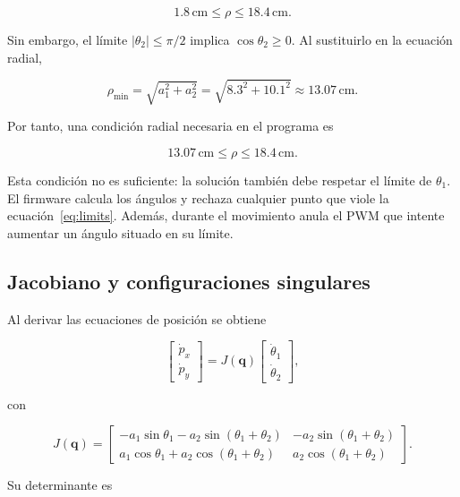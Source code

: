\documentclass[11pt,a4paper]{article}
\newcommand{\vect}[1]{\bm{#1}}
\begin{document}
\begin{equation}
1.8\,\mathrm{cm}\leq\rho\leq18.4\,\mathrm{cm}.
\end{equation}

Sin embargo, el límite $|\theta_2|\leq\pi/2$ implica $\cos\theta_2\geq0$. Al sustituirlo en la ecuación radial,

\begin{equation}
\rho_{\min}=\sqrt{a_1^2+a_2^2}
=\sqrt{8.3^2+10.1^2}
\approx13.07\,\mathrm{cm}.
\end{equation}

Por tanto, una condición radial necesaria en el programa es

\begin{equation}
13.07\,\mathrm{cm}\leq\rho\leq18.4\,\mathrm{cm}.
\end{equation}

Esta condición no es suficiente: la solución también debe respetar el límite de $\theta_1$. El firmware calcula los ángulos y rechaza cualquier punto que viole la ecuación~\eqref{eq:limits}. Además, durante el movimiento anula el PWM que intente aumentar un ángulo situado en su límite.

\subsection{Jacobiano y configuraciones singulares}

Al derivar las ecuaciones de posición se obtiene

\begin{equation}
\begin{bmatrix}
\dot p_x\\\dot p_y
\end{bmatrix}
=J(\vect{q})
\begin{bmatrix}
\dot\theta_1\\\dot\theta_2
\end{bmatrix},
\end{equation}

con

\begin{equation}
J(\vect{q})=
\begin{bmatrix}
-a_1\sin\theta_1-a_2\sin(\theta_1+\theta_2)&-a_2\sin(\theta_1+\theta_2)\\
a_1\cos\theta_1+a_2\cos(\theta_1+\theta_2)& a_2\cos(\theta_1+\theta_2)
\end{bmatrix}.
\end{equation}

Su determinante es
\end{document}
